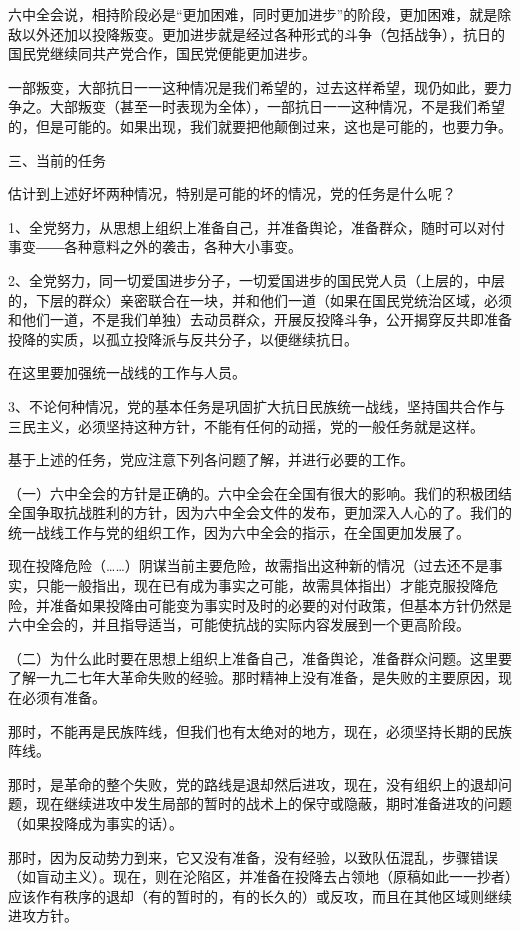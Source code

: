 六中全会说，相持阶段必是“更加困难，同时更加进步”的阶段，更加困难，就是除敌以外还加以投降叛变。更加进步就是经过各种形式的斗争（包括战争），抗日的国民党继续同共产党合作，国民党便能更加进步。

一部叛变，大部抗日一一这种情况是我们希望的，过去这样希望，现仍如此，要力争之。大部叛变（甚至一时表现为全体），一部抗日一一这种情况，不是我们希望的，但是可能的。如果出现，我们就要把他颠倒过来，这也是可能的，也要力争。

三、当前的任务

估计到上述好坏两种情况，特别是可能的坏的情况，党的任务是什么呢？

1、全党努力，从思想上组织上准备自己，并准备舆论，准备群众，随时可以对付事变――各种意料之外的袭击，各种大小事变。

2、全党努力，同一切爱国进步分子，一切爱国进步的国民党人员（上层的，中层的，下层的群众）亲密联合在一块，并和他们一道（如果在国民党统治区域，必须和他们一道，不是我们单独）去动员群众，开展反投降斗争，公开揭穿反共即准备投降的实质，以孤立投降派与反共分子，以便继续抗日。

在这里要加强统一战线的工作与人员。

3、不论何种情况，党的基本任务是巩固扩大抗日民族统一战线，坚持国共合作与三民主义，必须坚持这种方针，不能有任何的动摇，党的一般任务就是这样。

基于上述的任务，党应注意下列各问题了解，并进行必要的工作。

（一）六中全会的方针是正确的。六中全会在全国有很大的影响。我们的积极团结全国争取抗战胜利的方针，因为六中全会文件的发布，更加深入人心的了。我们的统一战线工作与党的组织工作，因为六中全会的指示，在全国更加发展了。

现在投降危险（……）阴谋当前主要危险，故需指出这种新的情况（过去还不是事实，只能一般指出，现在已有成为事实之可能，故需具体指出）才能克服投降危险，并准备如果投降由可能变为事实时及时的必要的对付政策，但基本方针仍然是六中全会的，并且指导适当，可能使抗战的实际内容发展到一个更高阶段。

（二）为什么此时要在思想上组织上准备自己，准备舆论，准备群众问题。这里要了解一九二七年大革命失败的经验。那时精神上没有准备，是失败的主要原因，现在必须有准备。

那时，不能再是民族阵线，但我们也有太绝对的地方，现在，必须坚持长期的民族阵线。

那时，是革命的整个失败，党的路线是退却然后进攻，现在，没有组织上的退却问题，现在继续进攻中发生局部的暂时的战术上的保守或隐蔽，期时准备进攻的问题（如果投降成为事实的话）。

那时，因为反动势力到来，它又没有准备，没有经验，以致队伍混乱，步骤错误（如盲动主义）。现在，则在沦陷区，并准备在投降去占领地（原稿如此一一抄者）应该作有秩序的退却（有的暂时的，有的长久的）或反攻，而且在其他区域则继续进攻方针。

